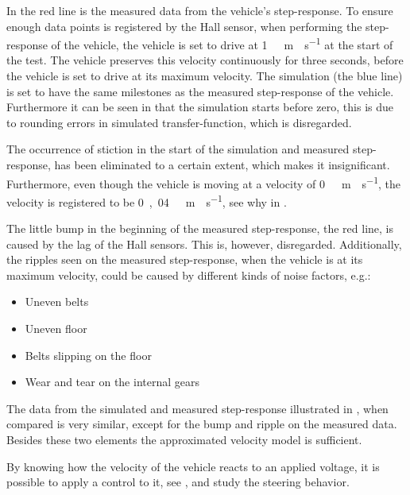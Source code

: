 %
In  the red line is the measured data from the vehicle's step-response. To ensure enough data points is registered by the Hall sensor, when performing the step-response of the vehicle, the vehicle is set to drive at \si{1\ m\cdot s^{-1}} at the start of the test. The vehicle preserves this velocity continuously for three seconds, before the vehicle is set to drive at its maximum velocity. The simulation (the blue line) is set to have the same milestones as the measured step-response of the vehicle. Furthermore it can be seen in  that the simulation starts before zero, this is due to rounding errors in simulated transfer-function, which is disregarded.

The occurrence of stiction in the start of the simulation and measured step-response, has been eliminated to a certain extent, which makes it insignificant. Furthermore, even though the vehicle is moving at a velocity of \si{0\ m \cdot s^{-1}}, the velocity is registered to be \si{0,04\ m \cdot s^{-1}}, see why in . 

The little bump in the beginning of the measured step-response, the red line, is caused by the lag of the Hall sensors. This is, however, disregarded. Additionally, the ripples seen on the measured step-response, when the vehicle is at its maximum velocity, could be caused by different kinds of noise factors, e.g.:

\begin{itemize}
\item Uneven belts
\item Uneven floor
\item Belts slipping on the floor
\item Wear and tear on the internal gears
\end{itemize}

The data from the simulated and measured step-response illustrated in , when compared is very similar, except for the bump and ripple on the measured data. Besides these two elements the approximated velocity model is sufficient.

By knowing how the velocity of the vehicle reacts to an applied voltage, it is possible to apply a control to it, see , and study the steering behavior.